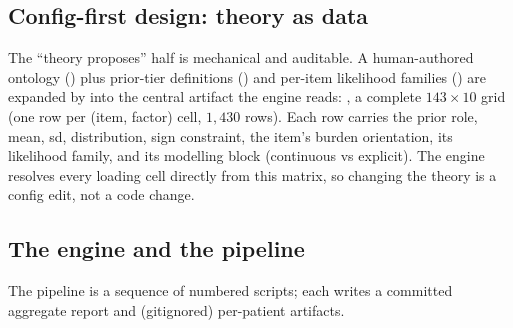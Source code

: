 \subsection{Config-first design: theory as data}
The ``theory proposes'' half is mechanical and auditable. A human-authored ontology ()
plus prior-tier definitions () and per-item likelihood families
() are expanded by  into the central artifact the
engine reads: , a complete $143\times 10$ grid (one row per
(item, factor) cell, $1{,}430$ rows). Each row carries the prior role, mean, sd, distribution, sign constraint,
the item's burden orientation, its likelihood family, and its modelling block (continuous vs explicit). The
engine resolves every loading cell directly from this matrix, so changing the theory is a config edit, not a
code change.

\subsection{The engine and the pipeline}
The pipeline is a sequence of numbered scripts; each writes a committed aggregate report and (gitignored)
per-patient artifacts.


